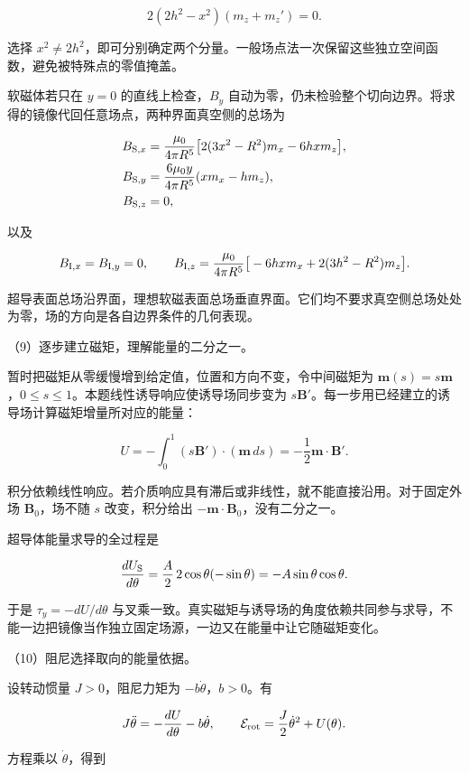 \documentclass[12pt,a4paper,fontset=fandol]{ctexart}
\begin{document}
\[
2(2h^2-x^2)(m_z+m_z')=0.
\]

选择
\(x^2\ne2h^2\)，即可分别确定两个分量。一般场点法一次保留这些独立空间函数，避免被特殊点的零值掩盖。

软磁体若只在 \(y=0\) 的直线上检查，\(B_y\)
自动为零，仍未检验整个切向边界。将求得的镜像代回任意场点，两种界面真空侧的总场为

\[
\begin{aligned}
B_{{\rm S},x}
&=\frac{\mu_0}{4\pi R^5}
\big[2(3x^2-R^2)m_x-6hx m_z\big],\\
B_{{\rm S},y}
&=\frac{6\mu_0y}{4\pi R^5}(xm_x-hm_z),\\
B_{{\rm S},z}&=0,
\end{aligned}
\]

以及

\[
B_{{\rm I},x}=B_{{\rm I},y}=0,\qquad
B_{{\rm I},z}=\frac{\mu_0}{4\pi R^5}
\big[-6hx m_x+2(3h^2-R^2)m_z\big].
\]

超导表面总场沿界面，理想软磁表面总场垂直界面。它们均不要求真空侧总场处处为零，场的方向是各自边界条件的几何表现。

（9）逐步建立磁矩，理解能量的二分之一。

暂时把磁矩从零缓慢增到给定值，位置和方向不变，令中间磁矩为
\(\boldsymbol m(s)=s\boldsymbol m\)，\(0\le s\le1\)。本题线性诱导响应使诱导场同步变为
\(s\boldsymbol B'\)。每一步用已经建立的诱导场计算磁矩增量所对应的能量：

\[
U=-\int_0^1(s\boldsymbol B')\cdot(\boldsymbol m\,ds)
=-\frac12\boldsymbol m\cdot\boldsymbol B'.
\]

积分依赖线性响应。若介质响应具有滞后或非线性，就不能直接沿用。对于固定外场
\(\boldsymbol B_0\)，场不随 \(s\) 改变，积分给出
\(-\boldsymbol m\cdot\boldsymbol B_0\)，没有二分之一。

超导体能量求导的全过程是

\[
\frac{dU_{\rm S}}{d\theta}
=\frac A2\,2\cos\theta(-\sin\theta)
=-A\sin\theta\cos\theta.
\]

于是 \(\tau_y=-dU/d\theta\)
与叉乘一致。真实磁矩与诱导场的角度依赖共同参与求导，不能一边把镜像当作独立固定场源，一边又在能量中让它随磁矩变化。

（10）阻尼选择取向的能量依据。

设转动惯量 \(J>0\)，阻尼力矩为 \(-b\dot\theta\)，\(b>0\)。有

\[
J\ddot\theta=-\frac{dU}{d\theta}-b\dot\theta,\qquad
\mathcal E_{\rm rot}=\frac J2\dot\theta^2+U(\theta).
\]

方程乘以 \(\dot\theta\)，得到
\end{document}
